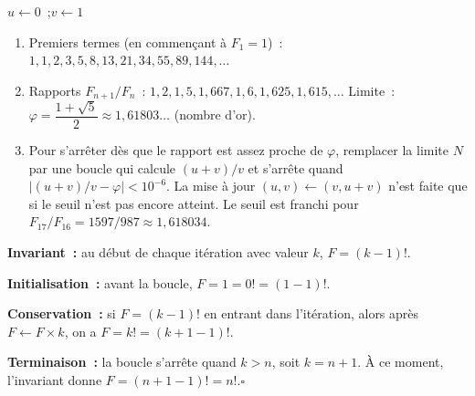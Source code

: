 
\begin{algorithm}[H]
\caption{Fibonacci et nombre d'or}
$u \leftarrow 0$~;\quad $v \leftarrow 1$\;
\end{algorithm}

\begin{enumerate}
  \item Premiers termes (en commen\c cant \`a $F_1=1$)~:
        $1,1,2,3,5,8,13,21,34,55,89,144,\ldots$
  \item Rapports $F_{n+1}/F_n$~: $1, 2, 1{,}5, 1{,}667, 1{,}6, 1{,}625, 1{,}615,\ldots$
        Limite~: $\varphi = \dfrac{1+\sqrt{5}}{2} \approx 1{,}61803\ldots$ (nombre d'or).
  \item Pour s'arr\^eter d\`es que le rapport est assez proche de $\varphi$,
        remplacer la limite $N$ par une boucle qui calcule $(u+v)/v$ et
        s'arr\^ete quand $\bigl|(u+v)/v-\varphi\bigr|<10^{-6}$.
        La mise \`a jour $(u,v)\leftarrow(v,u+v)$ n'est faite que si
        le seuil n'est pas encore atteint. Le seuil est franchi pour $F_{17}/F_{16}=1597/987\approx1{,}618034$.
\end{enumerate}


\textbf{Invariant~:} au d\'ebut de chaque it\'eration avec valeur $k$,
$F = (k-1)!$.

\textbf{Initialisation~:} avant la boucle, $F=1=0!=(1-1)!$. \checkmark

\textbf{Conservation~:} si $F=(k-1)!$ en entrant dans l'it\'eration,
alors apr\`es $F\leftarrow F\times k$, on a $F=k!=(k+1-1)!$. \checkmark

\textbf{Terminaison~:} la boucle s'arr\^ete quand $k>n$, soit $k=n+1$.
\`A ce moment, l'invariant donne $F=(n+1-1)!=n!$.\hfill$\square$



